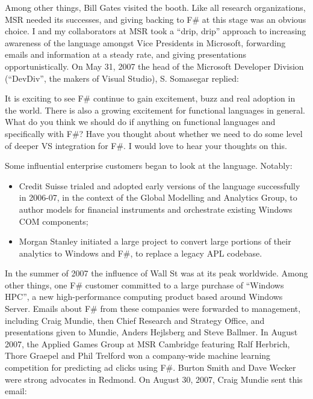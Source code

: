 \documentclass[acmsmall,review]{acmart}\settopmatter{printfolios=true,printccs=false,printacmref=false}
\begin{document}
Among other things, Bill Gates visited the booth. Like all research organizations, MSR needed its successes, and giving backing to F\# at this stage was an obvious choice. I and my collaborators at MSR took a “drip, drip” approach to increasing awareness of the language amongst Vice Presidents in Microsoft, forwarding emails and information at a steady rate, and giving presentations opportunistically.   On May 31, 2007 the head of the Microsoft Developer Division (“DevDiv”, the makers of Visual Studio), S. Somasegar replied:

\begin{verbquote}
It is exciting to see F\# continue to gain excitement, buzz and real adoption in the world. There is also a growing excitement for functional languages in general. What do you think we should do if anything on functional languages and specifically with F\#?  Have you thought about whether we need to do some level of deeper VS integration for F\#.  I would love to hear your thoughts on this.
\end{verbquote}
Some influential enterprise customers began to look at the language.  Notably:

\begin{itemize}
\item Credit Suisse trialed and adopted early versions of the language successfully in 2006-07, in the context of the Global Modelling and Analytics Group, to author models for financial instruments and orchestrate existing Windows COM components;
\item Morgan Stanley initiated a large project to convert large portions of their analytics to Windows and F\#, to replace a legacy APL codebase. 
\end{itemize}

In the summer of 2007 the influence of Wall St was at its peak worldwide. Among other things, one F\# customer committed to a large purchase of “Windows HPC”, a new high-performance computing product based around Windows Server. Emails about F\# from these companies were forwarded to management, including Craig Mundie, then Chief Research and Strategy Office, and presentations given to Mundie, Anders Hejlsberg and Steve Ballmer.   In August 2007, the Applied Games Group at MSR Cambridge featuring Ralf Herbrich, Thore Graepel and Phil Trelford won a company-wide machine learning competition for predicting ad clicks using F\#.  Burton Smith and Dave Wecker were strong advocates in Redmond. On August 30, 2007, Craig Mundie sent this email:
\end{document}
